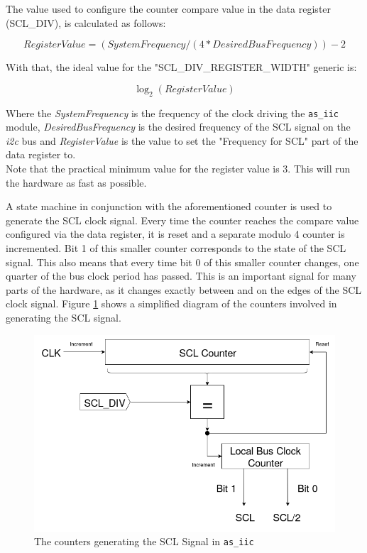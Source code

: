 The value used to configure the counter compare value in the data register (SCL\_DIV), is calculated as follows:

\[RegisterValue = (SystemFrequency / (4 * DesiredBusFrequency)) - 2 \]

With that, the ideal value for the "SCL\_DIV\_REGISTER\_WIDTH" generic is:

\[\log_{2}(RegisterValue)\]

Where the \textit{SystemFrequency} is the frequency of the clock driving the \texttt{as\_iic} module, \textit{DesiredBusFrequency} is the desired frequency of the SCL signal on the \textit{i2c} bus and \textit{RegisterValue} is the value to set the "Frequency for SCL" part of the data register to.\\
Note that the practical minimum value for the register value is 3.
This will run the hardware as fast as possible.

A state machine in conjunction with the aforementioned counter is used to generate the SCL clock signal. Every time the counter reaches the compare value configured via the data register, it is reset and a separate modulo 4 counter is incremented. Bit 1 of this smaller counter corresponds to the state of the SCL signal.
This also means that every time bit 0 of this smaller counter changes, one quarter of the bus clock period has passed.
This is an important signal for many parts of the hardware, as it changes exactly between and on the edges of the SCL clock signal.
Figure \ref{07-05-as-iic-scl-generation} shows a simplified diagram of the counters involved in generating the SCL signal.

\begin{figure}[htbp]
\noindent \begin{centering}
\includegraphics[width=\textwidth]{figs/07-05-as-iic-scl-generation}
\par\end{centering}
\caption{The counters generating the SCL Signal in \texttt{as\_iic}}
\label{07-05-as-iic-scl-generation}
\end{figure}


